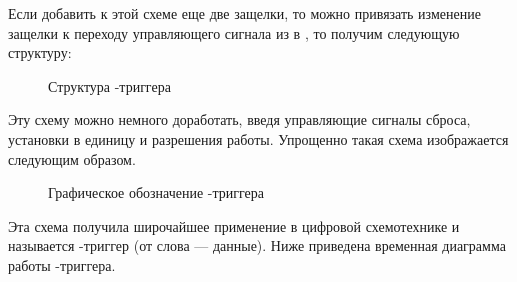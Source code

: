 
		
\par{Если добавить к этой схеме еще две защелки, то можно привязать изменение  защелки к переходу управляющего сигнала из  в , то получим следующую структуру:}

\begin{figure}[H]
	\centering
	\def\svgwidth{\columnwidth}
	
	\caption{Структура -триггера}
\end{figure}
		
\par{Эту схему можно немного доработать, введя управляющие сигналы сброса, установки в единицу и разрешения работы. Упрощенно такая схема изображается следующим образом.}

\begin{figure}[H]
	\centering
	\def\svgwidth{\columnwidth}
	
	\caption{Графическое обозначение -триггера}
\end{figure}
		
\par{Эта схема получила широчайшее применение в цифровой схемотехнике и называется -триггер (от слова  — данные). Ниже приведена временная диаграмма работы -триггера.}


